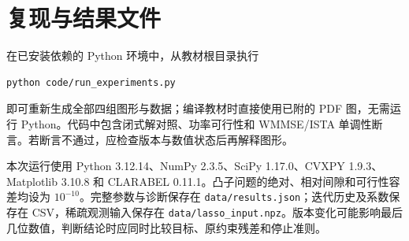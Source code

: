 \section{复现与结果文件}

在已安装依赖的 Python 环境中，从教材根目录执行
\begin{lstlisting}
python code/run_experiments.py
\end{lstlisting}
即可重新生成全部四组图形与数据；编译教材时直接使用已附的 PDF 图，无需运行 Python。代码中包含闭式解对照、功率可行性和 WMMSE/ISTA 单调性断言。若断言不通过，应检查版本与数值状态后再解释图形。

本次运行使用 Python 3.12.14、NumPy 2.3.5、SciPy 1.17.0、CVXPY 1.9.3、Matplotlib 3.10.8 和 CLARABEL 0.11.1。凸子问题的绝对、相对间隙和可行性容差均设为 $10^{-10}$。完整参数与诊断保存在
\texttt{data/results.json}；迭代历史及系数保存在 CSV，稀疏观测输入保存在
\texttt{data/lasso\_input.npz}。版本变化可能影响最后几位数值，判断结论时应同时比较目标、原约束残差和停止准则。
